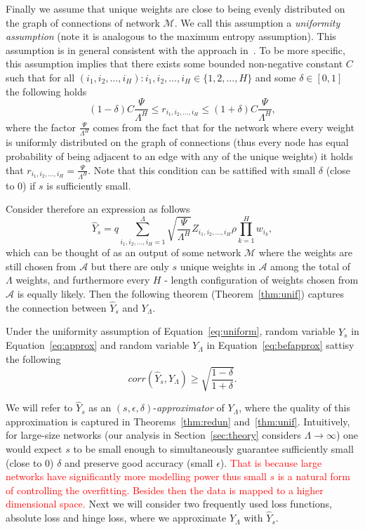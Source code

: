 \documentclass[twoside]{article}
\begin{document}
Finally we assume that unique weights are close to being evenly distributed on the graph of connections of network $\mathcal{M}$. We call this assumption a \textit{uniformity assumption} (note it is analogous to the maximum entropy assumption). This assumption is in general consistent with the approach in~\cite{NIPS2013_5025}. To be more specific, this assumption implies that there exists some bounded non-negative constant $C$ such that for all $(i_1,i_2,\dots,i_H):i_1,i_2,\dots,i_H \in \{1,2,\dots,H\}$ and some $\delta \in [0,1]$ the following holds
\begin{equation}
(1-\delta)C\frac{\Psi}{\Lambda^H} \leq r_{i_1,i_2,\dots,i_H} \leq (1+\delta)C\frac{\Psi}{\Lambda^H},
\label{eq:uniform}
\end{equation}
where the factor $\frac{\Psi}{\Lambda^H}$ comes from the fact that for the network where every weight is uniformly distributed on the graph of connections (thus every node has equal probability of being adjacent to an edge with any of the unique weights) it holds that $r_{i_1,i_2,\dots,i_H} = \frac{\Psi}{\Lambda^H}$. Note that this condition can be sattified with small $\delta$ (close to $0$) if $s$ is sufficiently small.

Consider therefore an expression as follows
\begin{equation}
\hat{Y}_s = q\sum_{i_1,i_2,\dots,i_H=1}^{\Lambda}\sqrt{\frac{\Psi}{\Lambda^H}}Z_{i_1,i_2,\dots,i_H}\rho\prod_{k = 1}^{H}w_{i_k},
\label{eq:approx}
\end{equation}
which can be thought of as an output of some network $\mathcal{M}$ where the weights are still chosen from $\mathcal{A}$ but there are only $s$ unique weights in $\mathcal{A}$ among the total of $\Lambda$ weights, and furthermore every $H$ - length configuration of weights chosen from $\mathcal{A}$ is equally likely. Then the following theorem (Theorem~\ref{thm:unif}) captures the connection between $\hat{Y}_s$ and $Y_{\Lambda}$.

\begin{theorem}
Under the uniformity assumption of Equation~\ref{eq:uniform}, random variable $\hat{Y}_s$ in Equation~\ref{eq:approx} and random variable $Y_{\Lambda}$ in Equation~\ref{eq:befapprox} sattisy the following
\[corr(\hat{Y}_s,Y_{\Lambda}) \geq \sqrt{\frac{1-\delta}{1+\delta}}.
\]
\label{thm:unif}
\end{theorem}

We will refer to $\hat{Y}_s$ as an $(s,\epsilon,\delta)$-\textit{approximator} of $Y_{\Lambda}$, where the quality of this approximation is captured in Theorems~\ref{thm:redun} and~\ref{thm:unif}. Intuitively, for large-size networks (our analysis in Section~\ref{sec:theory} considers $\Lambda \rightarrow \infty$) one would expect $s$ to be small enough to simultaneously guarantee sufficiently small (close to $0$) $\delta$ and preserve good accuracy (small $\epsilon$). \textcolor{red}{That is because large networks have significantly more modelling power thus small $s$ is a natural form of controlling the overfitting. Besides then the data is mapped to a higher dimensional space.} Next we will consider two frequently used loss functions, absolute loss and hinge loss, where we approximate $Y_{\Lambda}$ with $\hat{Y}_s$. 
\end{document}

